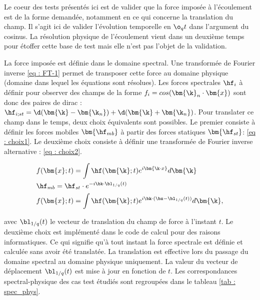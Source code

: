 Le coeur des tests présentés ici est de valider que la force imposée à l'écoulement est de la forme demandée, notamment en ce qui concerne la translation du champ. Il s'agit ici de valider l'évolution temporelle en $\o_q t$ dans l'argument du cosinus. La résolution physique de l'écoulement vient dans un deuxième temps pour étoffer cette base de test mais elle n'est pas l'objet de la validation.

La force imposée est définie dans le domaine spectral. Une transformée de Fourier inverse \ref{eq : FT-1} permet de transposer cette force au domaine physique (domaine dans lequel les équations sont résolues). Les forces spectrales $\hf_i$ à définir pour observer des champs de la forme $f_i=cos(\bm{\k}_n \cdot \bm{x})$ sont donc des paires de dirac : $\hf_{i;st} = \d(\bm{\k}-\bm{\k_n}) + \d(\bm{\k}+\bm{\k_n})$. Pour translater ce champ dans le temps, deux choix équivalents sont possibles. Le premier consiste à définir les forces mobiles $\bm{\hf_{mb}}$ à partir des forces statiques $\bm{\hf_{st}} $: \ref{eq : choix1}. Le deuxième choix consiste à définir une transformée de Fourier inverse alternative : \ref{eq : choix2}.

\begin{align}
&f(\bm{x};t) = \int \hf(\bm{\k};t) e^{i \bm{\k \cdot x} } d\bm{\k}
\label{eq : FT-1} \\
    &\hf_{mb} = \hf_{st} \cdot e^{-i \bk \cdot \bl_{1/q}(t)}
\label{eq : choix1} \\
    &f(\bm{x};t) = \int \hf(\bm{\k};t) e^{i {\bk \cdot (\bx - \bl_{1/q}(t))} } d\bm{\k},
\label{eq : choix2}
\end{align}

avec $\bl_{1/q}(t)$ le vecteur de translation du champ de force à l'instant $t$. Le deuxième choix est implémenté dans le code de calcul pour des raisons informatiques. Ce qui signifie qu'à tout instant la force spectrale est définie et calculée sans avoir été translatée. La translation est effective lors du passage du domaine spectral au domaine physique uniquement. La valeur du vecteur de déplacement $\bl_{1/q}(t)$ est mise à jour en fonction de $t$. Les correspondances spectral-physique des cas test étudiés sont regroupées dans le tableau \ref{tab : spec_phys}.

